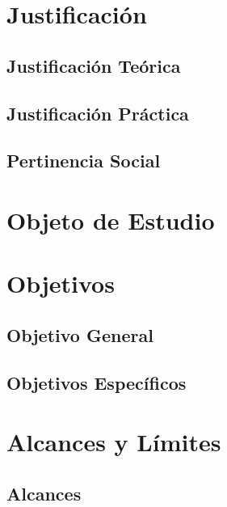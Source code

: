 \documentclass[11pt,oneside,letterpaper]{book}
\begin{document}
        \section{Justificación}
        \lipsum[1]

            \subsection{Justificación Teórica}
            \lipsum[1]

            \subsection{Justificación Práctica}
            \lipsum[1]

            \subsection{Pertinencia Social}
            \lipsum[1]

        \section{Objeto de Estudio}
        \lipsum[1]

        \section{Objetivos}
        \lipsum[1]

            \subsection{Objetivo General}
            \lipsum[1]

            \subsection{Objetivos Específicos}
            \lipsum[1]

        \section{Alcances y Límites}
        \lipsum[1]

            \subsection{Alcances}
            \lipsum[1]
\end{document}
